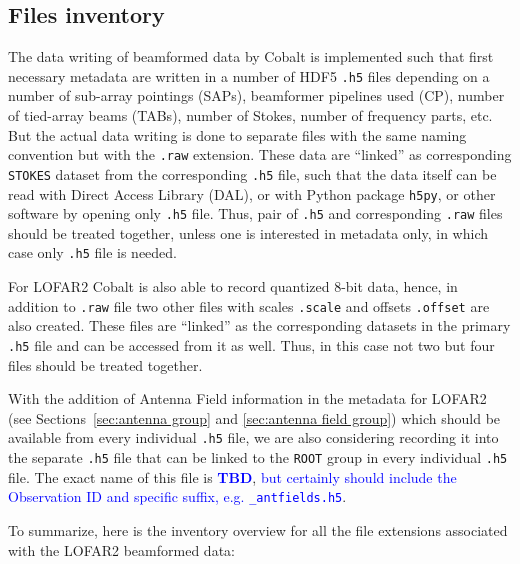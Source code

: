 \documentclass[a4paper,10pt,bibtotoc]{scrartcl}
\begin{document}
\subsection{Files inventory}
\label{sec:files inventory}
The data writing of beamformed data by Cobalt is implemented such that first necessary metadata are written in a number of HDF5 \verb|.h5| files depending on a number of sub-array pointings (SAPs), beamformer pipelines used (CP), number of tied-array beams (TABs), number of Stokes, number of frequency parts, etc. But the actual data writing is done to separate files with the same naming convention but with the \verb|.raw| extension. These data are ``linked'' as corresponding \verb|STOKES| dataset from the corresponding \verb|.h5| file, such that the data itself can be read with Direct Access Library (DAL), or with Python package \verb|h5py|, or other software by opening only \verb|.h5| file.
Thus, pair of \verb|.h5| and corresponding \verb|.raw| files should be treated together, unless one is interested in metadata only, in which case only \verb|.h5| file is needed.

For LOFAR2 Cobalt is also able to record quantized 8-bit data, hence, in addition to \verb|.raw| file two other files with scales \verb|.scale| and offsets \verb|.offset| are also created. These files are ``linked'' as the corresponding datasets in the primary \verb|.h5| file and can be accessed from it as well. Thus, in this case not two but four files should be treated together.

With the addition of Antenna Field information in the metadata for LOFAR2 (see Sections~\ref{sec:antenna group} and \ref{sec:antenna field group}) which should be available from every individual \verb|.h5| file, we are also considering recording it into the separate \verb|.h5| file that can be linked to the \verb|ROOT| group in every individual \verb|.h5| file. The exact name of this file is \textcolor{blue}{\bf TBD}, \textcolor{blue}{but certainly should include the Observation ID and specific suffix, e.g. \texttt{\_antfields.h5}}.

To summarize, here is the inventory overview for all the file extensions associated with the LOFAR2 beamformed data:
\end{document}
